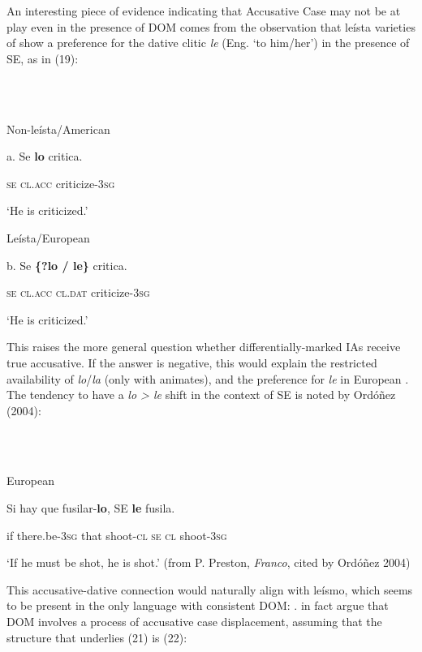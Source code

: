 \documentclass[output=paper]{langsci/langscibook}
\begin{document}
An interesting piece of evidence indicating that Accusative Case may not be at play even in the presence of DOM comes from the observation that leísta varieties of  show a preference for the dative clitic \textit{le} (Eng. ‘to him/her’) in the presence of SE, as in (19):

\ea%
    \label{ex:key:19}
    \gll\\
        \\
    \glt
    \z

          Non-leísta/American 

a.   Se  \textbf{lo}       critica.          

        \textsc{se  cl.acc} criticize\textsc{{}-3}\textsc{sg}

     ‘He is criticized.’

  Leísta/European 

  b.   Se \textbf{\{?lo    /    le\}}       critica.      

            \textsc{se  cl.acc  cl.dat}   criticize\textsc{{}-3}\textsc{sg}

     ‘He is criticized.’

This raises the more general question whether differentially-marked IAs receive true accusative. If the answer is negative, this would explain the restricted availability of \textit{lo}/\textit{la} (only with animates), and the preference for \textit{le} in European . The tendency to have a \textit{lo > le} shift in the context of SE is noted by Ordóñez (2004):

\ea%
    \label{ex:key:20}
    \gll\\
        \\
    \glt
    \z

          European 

Si hay                 que  fusilar-\textbf{lo},  SE \textbf{le} fusila.       

       if  there.be\textsc{{}-3}\textsc{sg}  that  shoot\textsc{{}-cl  se  cl}  shoot\textsc{{}-3}\textsc{sg}

  ‘If he must be shot, he is shot.’ (from P. Preston, \textit{Franco}, cited by Ordóñez 2004)

This accusative-dative connection would naturally align with leísmo, which seems to be present in the only  language with consistent DOM: . \citet{ColominaEtAl2017} in fact argue that DOM involves a process of accusative case displacement, assuming that the structure that underlies (21) is (22):
\end{document}
